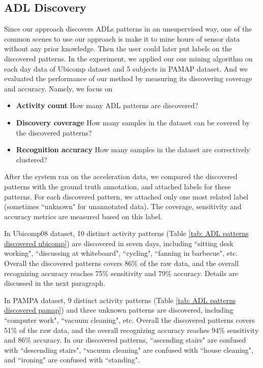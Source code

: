 \documentclass{sigchi}
\begin{document}
    \subsection{ADL Discovery}
    \label{subsec.exp.mining-on-same-day}

    Since our approach discovers ADLs patterns in an unsupervised way, one of the common scenes to use our approach is make it to mine hours of sensor data without any prior knowledge. Then the user could later put labels on the discovered patterns.
    In the experiment, we applied our our mining algorithm on each day data of Ubicomp dataset and 5 subjects in PAMAP dataset.
    And we evaluated the performance of our method by measuring its discovering coverage and accuracy.
    Namely, we focus on
        \begin{itemize}
        \item \textbf{Activity count} How many ADL patterns are discovered?
        \item \textbf{Discovery coverage} How many samples in the dataset can be covered by the discovered patterns?
        \item \textbf{Recognition accuracy} How many samples in the dataset are correctively clustered?
        \end{itemize}

  
     After the system ran on the acceleration data, we compared the discovered patterns with the ground truth annotation, and attached labels for these patterns.
     For each discovered pattern, we attached only one most related label (sometimes ``unknown" for unannotated data).
     The coverage, sensitivity and accuracy metrics are measured based on this label.
     
     In Ubicomp08 dataset, 10 distinct activity patterns (Table \ref{tab: ADL patterns discovered ubicomp}) are discovered in seven days, including ``sitting desk working", ``discussing at whiteboard", ``cycling", ``fanning in barbecue", etc.
     Overall the discovered patterns covers 86\% of the raw data, and the overall recognizing accuracy reaches 75\% sensitivity and 79\% accuracy. Details are discussed in the next paragraph.
     
     In PAMPA dataset, 9 distinct activity patterns (Table \ref{tab: ADL patterns discovered pamap}) and three unknown patterns are discovered, including ``computer work", ``vacuum cleaning", etc.
     Overall the discovered patterns covers 51\% of the raw data, and the overall recognizing accuracy reaches 94\% sensitivity and 86\% accuracy. In our discovered patterns, ``ascending stairs" are confused with ``descending stairs", ``vacuum cleaning" are confused with ``house cleaning", and ``ironing" are confused with ``standing".
     
\end{document}
